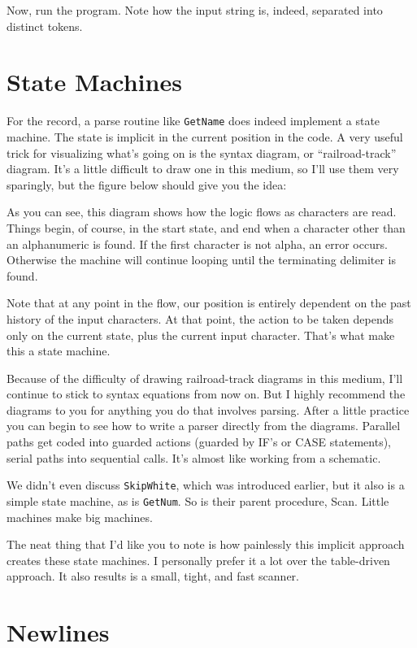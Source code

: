 Now, run the program. Note how the  input  string  is, indeed, separated into distinct tokens.

\section{State Machines}

For  the  record, a  parse  routine  like  {\tt GetName}  does  indeed implement a state machine. The state is implicit in  the current position in the code. A very useful trick for visualizing what's going on is  the  syntax  diagram, or  ``railroad-track'' diagram. It's a little difficult to draw  one  in this medium, so I'll use them very sparingly, but  the  figure  below  should give you the idea:

As  you  can  see, this  diagram  shows  how  the logic flows as characters  are  read. Things  begin, of course, in the  start state, and end when  a  character  other  than an alphanumeric is found. If  the  first  character  is not alpha, an error occurs. Otherwise the machine will continue looping until the terminating delimiter is found.

Note  that at any point in the flow, our  position  is  entirely dependent on the past  history  of the input characters. At that point, the action to be taken depends only on the  current state, plus the current input character. That's what make this  a state machine.

Because of the difficulty of drawing  railroad-track  diagrams in this medium, I'll continue to  stick to syntax equations from now on. But I highly recommend the diagrams to you for  anything you do that involves parsing. After a little practice you  can begin to  see  how  to  write  a  parser  directly from  the  diagrams. Parallel paths get coded into guarded actions (guarded by IF's or CASE statements), serial  paths  into  sequential  calls. It's almost like working from a schematic.

We didn't even discuss {\tt SkipWhite}, which  was  introduced earlier, but it also is a simple state machine, as is {\tt GetNum}. So is their parent procedure, Scan. Little machines make big machines.

The neat thing that I'd like  you  to note is how painlessly this implicit approach creates these  state  machines. I personally prefer it a lot over the table-driven approach. It  also results is a small, tight, and fast scanner.

\section{Newlines}

